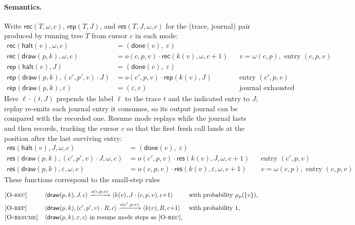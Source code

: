 \paragraph{Semantics.}
Write $\mathsf{rec}(T, \omega, c)$, $\mathsf{rep}(T, J)$, and $\mathsf{res}(T, J, \omega, c)$
for the (trace, journal) pair produced by running tree $T$ from cursor $c$ in each mode:
\begin{align*}
  \mathsf{rec}(\mathsf{halt}(v), \omega, c) &= (\mathsf{done}(v),\; \varepsilon)\\
  \mathsf{rec}(\mathsf{draw}(p, k), \omega, c) &= o(c,p,v) \cdot \mathsf{rec}(k(v), \omega, c{+}1)
    && v = \omega(c,p), \text{ entry } (c,p,v)\\[3pt]
  \mathsf{rep}(\mathsf{halt}(v), J) &= (\mathsf{done}(v),\; \varepsilon)\\
  \mathsf{rep}(\mathsf{draw}(p, k), (c',p',v) \cdot J) &= o(c',p,v) \cdot \mathsf{rep}(k(v), J)
    && \text{entry } (c',p,v)\\
  \mathsf{rep}(\mathsf{draw}(p, k), \varepsilon) &= (\varepsilon, \varepsilon)
    && \text{journal exhausted}
\end{align*}
Here $\ell \cdot (t, J)$ prepends the label $\ell$ to the trace $t$ and the indicated entry to
$J$; replay re-emits each journal entry it consumes, so its output journal can be compared
with the recorded one.
Resume mode replays while the journal lasts and then records, tracking the cursor $c$ so that
the first fresh call lands at the position after the last surviving entry:
\begin{align*}
  \mathsf{res}(\mathsf{halt}(v), J, \omega, c) &= (\mathsf{done}(v),\; \varepsilon)\\
  \mathsf{res}(\mathsf{draw}(p, k), (c',p',v) \cdot J, \omega, c) &= o(c',p,v) \cdot \mathsf{res}(k(v), J, \omega, c{+}1)
    && \text{entry } (c',p,v)\\
  \mathsf{res}(\mathsf{draw}(p, k), \varepsilon, \omega, c) &= o(c,p,v) \cdot \mathsf{res}(k(v), \varepsilon, \omega, c{+}1)
    && v = \omega(c,p), \text{ entry } (c,p,v)
\end{align*}
These functions correspond to the small-step rules
\begin{align*}
  &\textsc{[O-rec]} && \langle \mathsf{draw}(p,k), J, c \rangle \xrightarrow{o(c,p,v)} \langle k(v), J\cdot(c,p,v), c{+}1 \rangle
     && \text{with probability } \meas{p}(\{v\}),\\
  &\textsc{[O-rep]} && \langle \mathsf{draw}(p,k), (c',p',v)\cdot R, c \rangle \xrightarrow{o(c',p,v)} \langle k(v), R, c{+}1 \rangle
     && \text{with probability } 1,\\
  &\textsc{[O-resume]} && \langle \mathsf{draw}(p,k), \varepsilon, c \rangle \text{ in resume mode steps as \textsc{[O-rec]}},
\end{align*}
